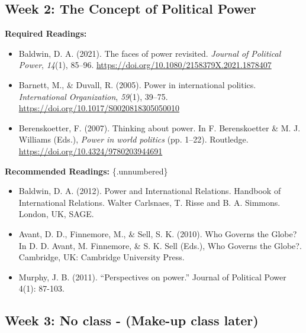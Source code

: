 \documentclass[
  letterpaper,
  DIV=11,
  numbers=noendperiod]{scrartcl}
\providecommand{\tightlist}{%
  \setlength{\itemsep}{0pt}\setlength{\parskip}{0pt}}\usepackage{longtable,booktabs,array}
\begin{document}
\hypertarget{week-2-the-concept-of-political-power}{%
\subsection*{Week 2: The Concept of Political
Power}\label{week-2-the-concept-of-political-power}}

\textbf{Required Readings:}

\begin{itemize}
\tightlist
\item
  Baldwin, D. A. (2021). The faces of power revisited. \emph{Journal of
  Political Power}, \emph{14}(1), 85--96.
  \url{https://doi.org/10.1080/2158379X.2021.1878407}
\item
  Barnett, M., \& Duvall, R. (2005). Power in international politics.
  \emph{International Organization}, \emph{59}(1), 39--75.
  \url{https://doi.org/10.1017/S0020818305050010}
\item
  Berenskoetter, F. (2007). Thinking about power. In F. Berenskoetter \&
  M. J. Williams (Eds.), \emph{Power in world politics} (pp. 1--22).
  Routledge. \url{https://doi.org/10.4324/9780203944691}
\end{itemize}

\textbf{Recommended Readings:} \{.unnumbered\}

\begin{itemize}
\tightlist
\item
  Baldwin, D. A. (2012). Power and International Relations. Handbook of
  International Relations. Walter Carlsnaes, T. Risse and B. A. Simmons.
  London, UK, SAGE.
\item
  Avant, D. D., Finnemore, M., \& Sell, S. K. (2010). Who Governs the
  Globe? In D. D. Avant, M. Finnemore, \& S. K. Sell (Eds.), Who Governs
  the Globe?. Cambridge, UK: Cambridge University Press.
\item
  Murphy, J. B. (2011). ``Perspectives on power.'' Journal of Political
  Power 4(1): 87-103.
\end{itemize}

\hypertarget{week-3-no-class---make-up-class-later}{%
\subsection*{Week 3: No class - (Make-up class
later)}\label{week-3-no-class---make-up-class-later}}
\end{document}
